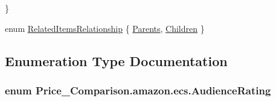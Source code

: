 \begin{DoxyCompactItemize}
 \}
\begin{DoxyCompactList}\small\item\em \end{DoxyCompactList}\item 
enum \hyperlink{namespace_price___comparison_1_1amazon_1_1ecs_a672b28e61a1b04d03e02acde8624ead9}{Related\-Items\-Relationship} \{ \hyperlink{namespace_price___comparison_1_1amazon_1_1ecs_a672b28e61a1b04d03e02acde8624ead9}{Parents}, 
\hyperlink{namespace_price___comparison_1_1amazon_1_1ecs_a672b28e61a1b04d03e02acde8624ead9}{Children}
 \}
\begin{DoxyCompactList}\small\item\em \end{DoxyCompactList}\end{DoxyCompactItemize}


\subsection{Enumeration Type Documentation}
\hypertarget{namespace_price___comparison_1_1amazon_1_1ecs_ac8343f4843dd20c1654e79b7e565048f}{
\subsubsection[{Audience\-Rating}]{\setlength{\rightskip}{0pt plus 5cm}enum {\bf Price\-\_\-\-Comparison.\-amazon.\-ecs.\-Audience\-Rating}}}\label{namespace_price___comparison_1_1amazon_1_1ecs_ac8343f4843dd20c1654e79b7e565048f}




